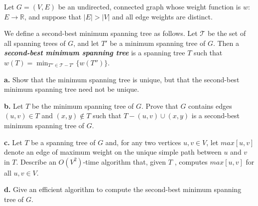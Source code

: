 Let $G = (V,E)$ be an undirected, connected graph whose weight function is $w$: 
$E \rightarrow \mathbb{R}$, and suppose that $|E| > |V|$ and all edge weights are 
distinct.

We define a second-best minimum spanning tree as follows. Let $\mathcal{T}$ be the 
set of all spanning trees of $G$, and let $T'$ be a minimum spanning tree of $G$. 
Then a \textit{\textbf{second-best minimum spanning tree}} is a spanning tree $T$ such 
that $w(T) = \min_{T'' \in \mathcal{T}-{T'}}\{w(T'')\}$.

\textbf{a.} Show that the minimum spanning tree is unique, but that the second-best 
minimum spanning tree need not be unique.

\textbf{b.} Let $T$ be the minimum spanning tree of $G$. Prove that $G$ contains edges
$(u,v) \in T$ and $(x,y) \notin T$ such that $T-{(u,v)}\cup{(x,y)}$ is a second-best 
minimum spanning tree of $G$.

\textbf{c.} Let $T$ be a spanning tree of $G$ and, for any two vertices $u,v \in V$, 
let $max[u,v]$ denote an edge of maximum weight on the unique simple path between 
$u$ and $v$ in $T$. Describe an $O(V^2)$-time algorithm that, given $T$ , computes 
$max[u,v]$ for all $u,v \in V$.

\textbf{d.} Give an efficient algorithm to compute the second-best minimum spanning 
tree of $G$.
